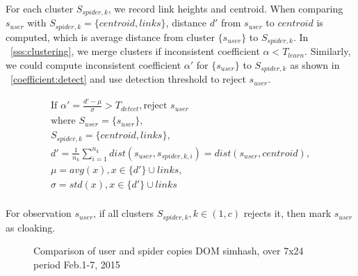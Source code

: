 For each cluster $S_{spider, k}$, we record link heights and centroid.
When comparing $s_{user}$ with $S_{spider, k} = \{centroid, links\}$, 
distance $d'$ from $s_{user}$ to $centroid$ is computed, which is average distance
from cluster $\{s_{user}\}$ to $S_{spider, k}$. In ~\autoref{sss:clustering}, we
merge clusters if inconsistent coefficient $\alpha < T_{learn}$. Similarly, we
could compute inconsistent coefficient $\alpha'$ for $\{s_{user}\}$ to $S_{spider, k}$ as
shown in ~\autoref{coefficient:detect} and use detection threshold to reject
$s_{user}$.

\begin{equation}
  \label{coefficient:detect}
  \begin{gathered}
    \text {If } \alpha' = \frac{d' - \mu}{\sigma} > T_{detect}, \text{reject } s_{user} \\
    \text{where }
    S_{user} = \{s_{user}\}, \\
   S_{spider, k} = \{centroid, links\}, \\
    d' = \frac{1}{n_k}\sum_{i=1}^{n_k} dist(s_{user}, s_{spider, k, i}) =
    dist(s_{user}, centroid), \\ 
    \mu = avg(x), x \in  \{d'\} \cup links, \\
    \sigma = std(x), x \in \{d'\} \cup links \\
  \end{gathered}
\end{equation}

For observation $s_{user}$, if all clusters $S_{spider, k}, k \in (1, c)$ rejects it, then
mark $s_{user}$ as cloaking.

\begin{figure}[t]
  \centering
  \caption{Comparison of user and spider copies DOM simhash, over 7x24 period Feb.1-7, 2015}
  \label{fig:google-simhash}
\end{figure}

